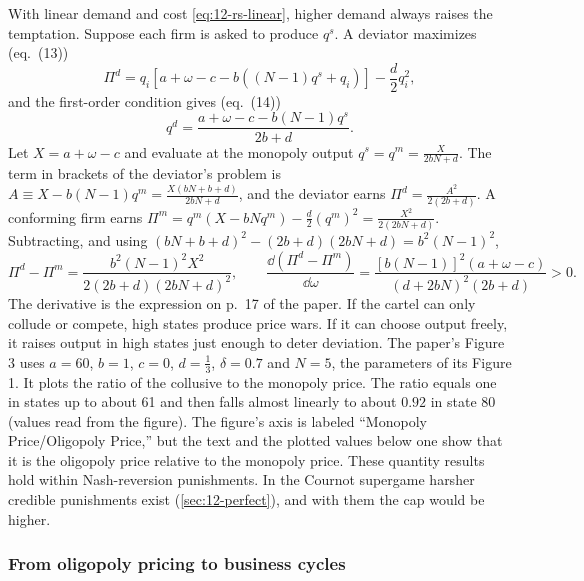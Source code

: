 With linear demand and cost \eqref{eq:12-rs-linear}, higher demand always raises the temptation. Suppose each firm is
asked to produce $q^s$. A deviator maximizes (eq.~(13))
\begin{equation*}
\Pi^d = q_i\left[a + \omega - c - b\left((N-1)q^s + q_i\right)\right] - \frac{d}{2}q_i^2 ,
\end{equation*}
and the first-order condition gives (eq.~(14))
\begin{equation*}
q^d = \frac{a + \omega - c - b(N-1)q^s}{2b + d} .
\end{equation*}
Let $X = a + \omega - c$ and evaluate at the monopoly output $q^s = q^m = \frac{X}{2bN + d}$. The term in brackets of the
deviator's problem is $A \equiv X - b(N-1)q^m = \frac{X(bN + b + d)}{2bN + d}$, and the deviator earns
$\Pi^d = \frac{A^2}{2(2b + d)}$. A conforming firm earns $\Pi^m = q^m(X - bNq^m) - \frac{d}{2}(q^m)^2 = \frac{X^2}{2(2bN + d)}$.
Subtracting, and using $(bN + b + d)^2 - (2b+d)(2bN + d) = b^2(N-1)^2$,
\begin{equation*}
\Pi^d - \Pi^m = \frac{b^2(N-1)^2 X^2}{2(2b+d)(2bN+d)^2}, \qquad
\frac{\dd(\Pi^d - \Pi^m)}{\dd\omega} = \frac{\left[b(N-1)\right]^2(a + \omega - c)}{(d + 2bN)^2(2b + d)} > 0 .
\end{equation*}
The derivative is the expression on p.~17 of the paper. If the cartel can only collude or compete, high states produce
price wars. If it can choose output freely, it raises output in high states just enough to deter deviation. The
paper's Figure 3 uses $a = 60$, $b = 1$, $c = 0$, $d = \frac{1}{3}$, $\delta = 0.7$ and $N = 5$, the parameters of its
Figure 1. It plots the ratio of the collusive to the monopoly price. The ratio equals one in states up to about 61 and
then falls almost linearly to about $0.92$ in state $80$ (values read from the figure).
The figure's axis is labeled ``Monopoly Price/Oligopoly Price,'' but the text and the plotted values below one
show that it is the oligopoly price relative to the monopoly price. These quantity results hold within Nash-reversion
punishments. In the Cournot supergame harsher credible punishments exist (\cref{sec:12-perfect}), and with them the
cap would be higher.

\subsubsection{From oligopoly pricing to business cycles}

